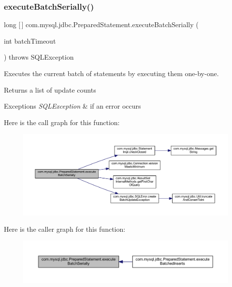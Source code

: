 \subsubsection{\texorpdfstring{execute\+Batch\+Serially()}{executeBatchSerially()}}
{\footnotesize\ttfamily long \mbox{[}$\,$\mbox{]} com.\+mysql.\+jdbc.\+Prepared\+Statement.\+execute\+Batch\+Serially (\begin{DoxyParamCaption}\item[{int}]{batch\+Timeout }\end{DoxyParamCaption}) throws S\+Q\+L\+Exception\hspace{0.3cm}{\ttfamily [protected]}}

Executes the current batch of statements by executing them one-\/by-\/one.

\begin{DoxyReturn}{Returns}
a list of update counts 
\end{DoxyReturn}

\begin{DoxyExceptions}{Exceptions}
{\em S\+Q\+L\+Exception} & if an error occurs \\
\hline
\end{DoxyExceptions}
Here is the call graph for this function\+:
\nopagebreak
\begin{figure}[H]
\begin{center}
\leavevmode
\includegraphics[width=350pt]{classcom_1_1mysql_1_1jdbc_1_1_prepared_statement_a0a87e79e103adae56e63a967e64c167c_cgraph}
\end{center}
\end{figure}
Here is the caller graph for this function\+:
\nopagebreak
\begin{figure}[H]
\begin{center}
\leavevmode
\includegraphics[width=350pt]{classcom_1_1mysql_1_1jdbc_1_1_prepared_statement_a0a87e79e103adae56e63a967e64c167c_icgraph}
\end{center}
\end{figure}
\mbox{\label{classcom_1_1mysql_1_1jdbc_1_1_prepared_statement_a7d300759d88bba2536598e70808c3b6b}} 

